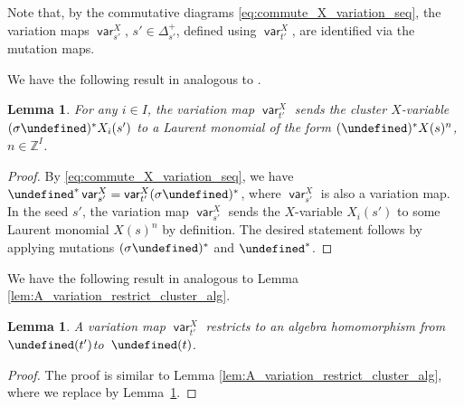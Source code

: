 \documentclass[10pt,a4paper]{amsart}
\newcommand{\Z}{\mathbb{Z}}
\newcommand{\opname}[1]{\operatorname{\mathsf{#1}}}
\newcommand{\var}{\opname{var}}
\let\XClAlg\undefined
\let\seq\undefined
\newcommand{\XClAlg}{\mathcal{U}^X}
\newcommand{\seq}{\boldsymbol{\mu}}%
\numberwithin{equation}{section}
\newtheorem{Lemma}[Theorem]{Lemma}
\begin{document}
Note that, by the commutative diagrams \eqref{eq:commute_X_variation_seq},
the variation maps $\var_{s'}^{X}$, $s'\in\Delta_{s'}^{+}$, defined
using $\var_{t'}^{X}$, are identified via the mutation maps.



 We have the following result in analogous to \cite[Lemma 4.2.2\,(ii)]{qin2017triangular}.
\begin{Lemma}\label{lem:variation_X_variables_similar}
For any $i\in I$, the variation map $\var_{t'}^X$ sends the cluster $X$-variable $(\sigma\seq)^* X_i(s')$ to a Laurent monomial of the form $(\seq)^* X(s)^n$, $n\in \Z^I$.
\end{Lemma}
\begin{proof}
By \eqref{eq:commute_X_variation_seq}, we have $\seq^*\var_{s'}^X =\var_{t'}^X(\sigma \seq)^*$, where $\var_{s'}^X$ is also a variation map. In the seed $s'$, the variation map $\var_{s'}^X$ sends the $X$-variable $X_i(s')$ to some Laurent monomial $X(s)^n$ by definition. The desired statement follows by applying mutations $(\sigma \seq)^*$ and $\seq^*$.
\end{proof}

We have the following result in analogous to Lemma \ref{lem:A_variation_restrict_cluster_alg}.
\begin{Lemma}\label{lem:X_variation_restrict_cluster_alg}
 A variation map $\var_{t'}^{X}$ restricts to an algebra homomorphism from $\XClAlg(t')$\linebreak to~$\XClAlg(t)$.
 \end{Lemma}
 \begin{proof}
The proof is similar to Lemma \ref{lem:A_variation_restrict_cluster_alg}, where we replace \cite[Lemma 4.2.2\,(ii)]{qin2017triangular} by Lem\-ma~\ref{lem:variation_X_variables_similar}.
 \end{proof}
\end{document}
